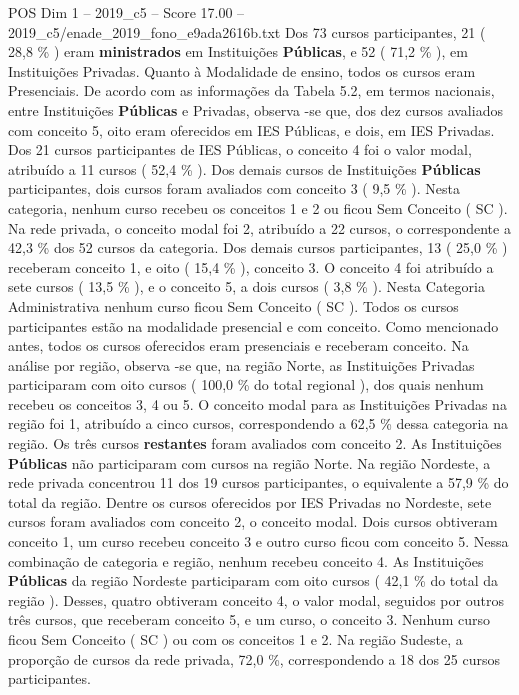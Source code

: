 \begin{textsample}{POS Dim 1 – 2019\_c5 – Score 17.00 – 2019\_c5/enade\_2019\_fono\_e9ada2616b.txt}
Dos 73 cursos participantes, 21 ( 28,8 \% ) eram \textbf{ministrados} em Instituições \textbf{Públicas}, e 52 ( 71,2 \% ), em Instituições Privadas.
Quanto à Modalidade de ensino, todos os cursos eram Presenciais.
De acordo com as informações da Tabela 5.2, em termos nacionais, entre Instituições \textbf{Públicas} e Privadas, observa -se que, dos dez cursos avaliados com conceito 5, oito eram oferecidos em IES Públicas, e dois, em IES Privadas.
Dos 21 cursos participantes de IES Públicas, o conceito 4 foi o valor modal, atribuído a 11 cursos ( 52,4 \% ).
Dos demais cursos de Instituições \textbf{Públicas} participantes, dois cursos foram avaliados com conceito 3 ( 9,5 \% ).
Nesta categoria, nenhum curso recebeu os conceitos 1 e 2 ou ficou Sem Conceito ( SC ).
Na rede privada, o conceito modal foi 2, atribuído a 22 cursos, o correspondente a 42,3 \% dos 52 cursos da categoria.
Dos demais cursos participantes, 13 ( 25,0 \% ) receberam conceito 1, e oito ( 15,4 \% ), conceito 3.
O conceito 4 foi atribuído a sete cursos ( 13,5 \% ), e o conceito 5, a dois cursos ( 3,8 \% ).
Nesta Categoria Administrativa nenhum curso ficou Sem Conceito ( SC ).
Todos os cursos participantes estão na modalidade presencial e com conceito.
Como mencionado antes, todos os cursos oferecidos eram presenciais e receberam conceito.
Na análise por região, observa -se que, na região Norte, as Instituições Privadas participaram com oito cursos ( 100,0 \% do total regional ), dos quais nenhum recebeu os conceitos 3, 4 ou 5.
O conceito modal para as Instituições Privadas na região foi 1, atribuído a cinco cursos, correspondendo a 62,5 \% dessa categoria na região.
Os três cursos \textbf{restantes} foram avaliados com conceito 2.
As Instituições \textbf{Públicas} não participaram com cursos na região Norte.
Na região Nordeste, a rede privada concentrou 11 dos 19 cursos participantes, o equivalente a 57,9 \% do total da região.
Dentre os cursos oferecidos por IES Privadas no Nordeste, sete cursos foram avaliados com conceito 2, o conceito modal.
Dois cursos obtiveram conceito 1, um curso recebeu conceito 3 e outro curso ficou com conceito 5.
Nessa combinação de categoria e região, nenhum recebeu conceito 4.
As Instituições \textbf{Públicas} da região Nordeste participaram com oito cursos ( 42,1 \% do total da região ).
Desses, quatro obtiveram conceito 4, o valor modal, seguidos por outros três cursos, que receberam conceito 5, e um curso, o conceito 3.
Nenhum curso ficou Sem Conceito ( SC ) ou com os conceitos 1 e 2.
Na região Sudeste, a proporção de cursos da rede privada, 72,0 \%, correspondendo a 18 dos 25 cursos participantes.

\end{textsample}
